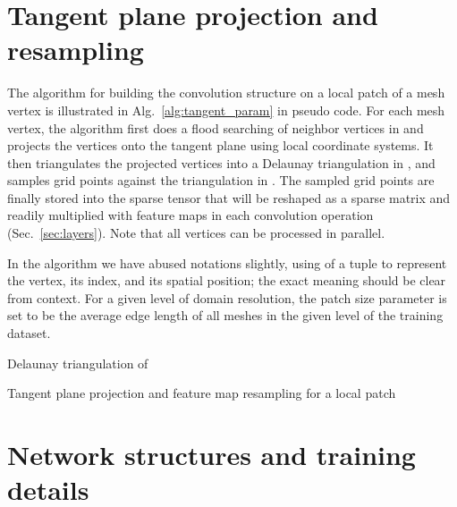 \documentclass[10pt,twocolumn,letterpaper]{article}
\begin{document}
\section{Tangent plane projection and resampling}
\label{appn:projection_resample}

The algorithm for building the convolution structure on a local patch of a mesh vertex is illustrated in Alg.~\ref{alg:tangent_param} in pseudo code.
For each mesh vertex, the algorithm first does a flood searching of  neighbor vertices in  and projects the vertices onto the tangent plane using local coordinate systems.
It then triangulates the projected vertices into a Delaunay triangulation in , 
and samples  grid points against the triangulation in .
The sampled grid points are finally stored into the sparse tensor that will be reshaped as a sparse matrix and readily multiplied with feature maps in each convolution operation (Sec.~\ref{sec:layers}).
Note that all vertices can be processed in parallel.

In the algorithm we have abused notations slightly, using  of a tuple to represent the vertex, its index, and its spatial position; the exact meaning should be clear from context.
For a given level of domain resolution, the patch size parameter  is set to be the average edge length of all meshes in the given level of the training dataset.


\begin{algorithm}
	\SetAlgoLined {} 
	
	\;
	
	 Delaunay triangulation of \;
	
	
	
	\caption{Tangent plane projection and feature map resampling for a local patch} 
	\label{alg:tangent_param}
\end{algorithm}

\section{Network structures and training details}
\label{appn:experiment_details}
\end{document}
